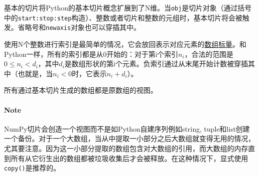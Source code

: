 \documentclass[../main]{subfile}
\begin{document}
基本的切片将Python的基本切片概念扩展到了N维。当\lstinline{obj}是切片对象（通过括号中的\lstinline{start:stop:step}构造）、整数或者切片和整数的元组时，基本切片将会被触发。省略号和\lstinline{newaxis}对象也可以穿插其中。

使用N个整数进行索引是最简单的情况，它会放回表示对应元素的\href{https://numpy.org/doc/stable/reference/arrays.scalars.html#arrays-scalars}{数组标量}。和Python一样，所有的索引都是从0开始的：对于第i个索引$n_i$，合法的范围是$0 \leq n_i < d_i$，其中$d_i$是数组形状的第i个元素。负索引通过从末尾开始计数被穿插其中（也就是，当$n_i < 0$时，它表示$n_i + d_i$）。

所有通过基本切片生成的数组都是原数组的视图。

\paragraph{Note}NumPy切片会创造一个视图而不是如Python自建序列例如string, tuple和list创建一个备份。对于一个大数组，当从中提取一小部分之后大数组就变得无用的情况，尤其要注意。因为这一小部分提取的数组包含对大数组的引用，而大数组的内存直到所有从它衍生出的数组都被垃圾收集后才会被释放。在这种情况下，显式使用\lstinline{copy()}是推荐的。
\end{document}
